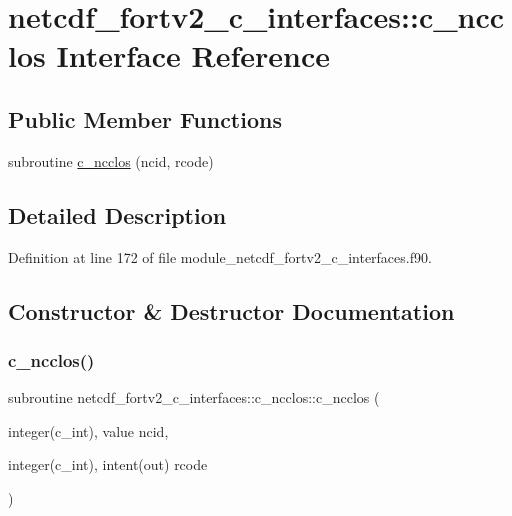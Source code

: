 \hypertarget{interfacenetcdf__fortv2__c__interfaces_1_1c__ncclos}{}\section{netcdf\+\_\+fortv2\+\_\+c\+\_\+interfaces\+:\+:c\+\_\+ncclos Interface Reference}
\label{interfacenetcdf__fortv2__c__interfaces_1_1c__ncclos}
\subsection*{Public Member Functions}
\begin{DoxyCompactItemize}
\item 
subroutine \hyperlink{interfacenetcdf__fortv2__c__interfaces_1_1c__ncclos_aef6b452f86ec9f47cbd10aa3148b3dc4}{c\+\_\+ncclos} (ncid, rcode)
\end{DoxyCompactItemize}


\subsection{Detailed Description}


Definition at line 172 of file module\+\_\+netcdf\+\_\+fortv2\+\_\+c\+\_\+interfaces.\+f90.



\subsection{Constructor \& Destructor Documentation}
\mbox{\label{interfacenetcdf__fortv2__c__interfaces_1_1c__ncclos_aef6b452f86ec9f47cbd10aa3148b3dc4}} 
\subsubsection{\texorpdfstring{c\+\_\+ncclos()}{c\_ncclos()}}
{\footnotesize\ttfamily subroutine netcdf\+\_\+fortv2\+\_\+c\+\_\+interfaces\+::c\+\_\+ncclos\+::c\+\_\+ncclos (\begin{DoxyParamCaption}\item[{integer(c\+\_\+int), value}]{ncid,  }\item[{integer(c\+\_\+int), intent(out)}]{rcode }\end{DoxyParamCaption})}



